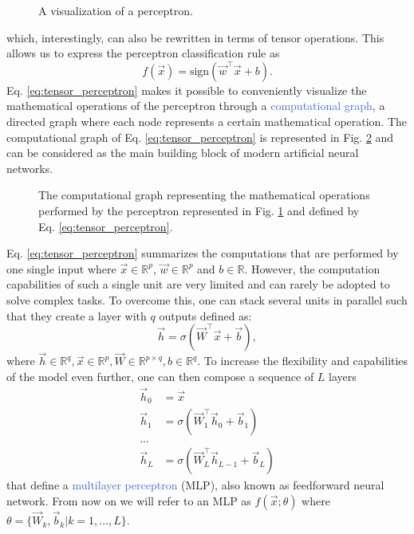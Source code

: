 \begin{figure}[ht!]
	\centering
	
\caption{A visualization of a perceptron.}
\label{fig:perceptron}
\end{figure}
\noindent which, interestingly, can also be rewritten in terms of tensor operations. This allows us to express the perceptron classification rule as 
\begin{equation}
	f(\vec{x}) = \text{sign}(\vec{w}^\intercal \vec{x} + b).
	\label{eq:tensor_perceptron}
\end{equation}
Eq. \ref{eq:tensor_perceptron} makes it possible to conveniently visualize the mathematical operations of the perceptron through a \textcolor{RoyalBlue}{computational graph}, a directed graph where each node represents a certain mathematical operation. The computational graph of Eq. \ref{eq:tensor_perceptron} is represented in Fig. \ref{fig:computational_graph_0} and can be considered as the main building block of modern artificial neural networks.
\begin{figure}[ht!]
	\centering
	
	\caption{The computational graph representing the mathematical operations performed by the perceptron represented in Fig. \ref{fig:perceptron} and defined by Eq. \ref{eq:tensor_perceptron}.}
\label{fig:computational_graph_0}
\end{figure}

Eq. \ref{eq:tensor_perceptron} summarizes the computations that are performed by one single input where $\vec{x}\in\mathds{R}^{p}$, $\vec{w}\in\mathds{R}^{p}$ and $b\in\mathds{R}$. However, the computation capabilities of such a single unit are very limited and can rarely be adopted to solve complex tasks. To overcome this, one can stack several units in parallel such that they create a layer with $q$ outputs defined as:
\begin{equation}
	\vec{h} = \sigma(\vec{W}^\intercal\vec{x}+\vec{b}),
\end{equation}
where $\vec{h}\in\mathds{R}^{q},\vec{x}\in\mathds{R}^{p},\vec{W}\in\mathds{R}^{p\times q},b\in\mathds{R}^{q}$. To increase the flexibility and capabilities of the model even further, one can then compose a sequence of $L$ layers
\begin{equation}
	\begin{split}
		\vec{h}_0 & = \vec{x} \\ 
		\vec{h}_1 & = \sigma(\vec{W}^{\intercal}_{1}\vec{h}_0 + \vec{b}_1) \\ 
	... \\
		\vec{h}_L & = \sigma(\vec{W}^{\intercal}_{L}\vec{h}_{L-1}+\vec{b}_{L})
	\end{split}
\end{equation}
that define a \textcolor{RoyalBlue}{multilayer perceptron} (MLP), also known as feedforward neural network. From now on we will refer to an MLP as $f(\vec{x};\theta)$ where $\theta=\{\vec{W}_k,\vec{b}_k|k=1,...,L\}$. 

